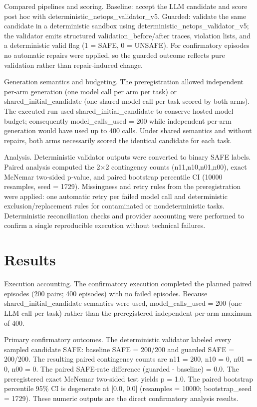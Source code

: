\documentclass[conference]{IEEEtran}
\begin{document}
Compared pipelines and scoring. Baseline: accept the LLM candidate and score post hoc with deterministic\_netops\_validator\_v5. Guarded: validate the same candidate in a deterministic sandbox using deterministic\_netops\_validator\_v5; the validator emits structured validation\_before/after traces, violation lists, and a deterministic valid flag (1 = SAFE, 0 = UNSAFE). For confirmatory episodes no automatic repairs were applied, so the guarded outcome reflects pure validation rather than repair‑induced change.

Generation semantics and budgeting. The preregistration allowed independent per‑arm generation (one model call per arm per task) or shared\_initial\_candidate (one shared model call per task scored by both arms). The executed run used shared\_initial\_candidate to conserve hosted model budget; consequently model\_calls\_used = 200 while independent per‑arm generation would have used up to 400 calls. Under shared semantics and without repairs, both arms necessarily scored the identical candidate for each task.

Analysis. Deterministic validator outputs were converted to binary SAFE labels. Paired analysis computed the 2\ensuremath{\times}2 contingency counts (n11,n10,n01,n00), exact McNemar two‑sided p‑value, and paired bootstrap percentile CI (10000 resamples, seed = 1729). Missingness and retry rules from the preregistration were applied: one automatic retry per failed model call and deterministic exclusion/replacement rules for contaminated or nondeterministic tasks. Deterministic reconciliation checks and provider accounting were performed to confirm a single reproducible execution without technical failures.

\section{Results}
Execution accounting. The confirmatory execution completed the planned paired episodes (200 pairs; 400 episodes) with no failed episodes. Because shared\_initial\_candidate semantics were used, model\_calls\_used = 200 (one LLM call per task) rather than the preregistered independent per‑arm maximum of 400.

Primary confirmatory outcomes. The deterministic validator labeled every sampled candidate SAFE: baseline SAFE = 200/200 and guarded SAFE = 200/200. The resulting paired contingency counts are n11 = 200, n10 = 0, n01 = 0, n00 = 0. The paired SAFE‑rate difference (guarded - baseline) = 0.0. The preregistered exact McNemar two‑sided test yields p = 1.0. The paired bootstrap percentile 95\% CI is degenerate at [0.0, 0.0] (resamples = 10000; bootstrap\_seed = 1729). These numeric outputs are the direct confirmatory analysis results.
\end{document}
